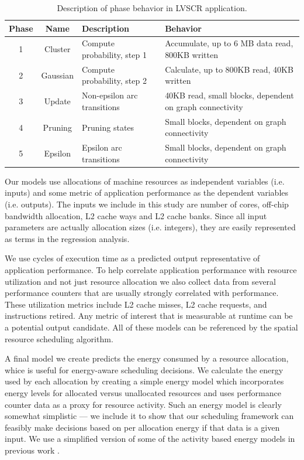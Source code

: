 \begin{table}[t]
\centering
\scriptsize
\begin{tabular}{|c|c|l|l|}
\hline
 Phase  & Name & Description & Behavior \\ \hline
 1 & Cluster  & Compute probability, step 1 &  Accumulate, up to 6 MB data read, 800KB written\\ \hline
 2 & Gaussian  & Compute probability, step 2 &  Calculate, up to 800KB read, 40KB written\\ \hline
 3 & Update & Non-epsilon arc transitions &40KB read, small blocks, dependent on graph connectivity\\ \hline
 4 & Pruning & Pruning states & Small blocks, dependent on graph connectivity\\ \hline
 5 & Epsilon & Epsilon arc transitions & Small blocks, dependent on graph connectivity\\ \hline
\end{tabular}
\caption{Description of phase behavior in LVSCR application.}
\label{table:app}
\end{table}

Our models use allocations of machine resources as independent variables (i.e. inputs) and some metric of application performance as the dependent variables (i.e. outputs).  The inputs we include in this study are number of cores, off-chip bandwidth allocation, L2 cache ways and L2 cache banks.  Since all input parameters are actually allocation sizes (i.e. integers), they are easily represented as terms in the regression analysis.

We use cycles of execution time as a predicted output representative of application performance.  To help correlate application performance with resource utilization and not just resource allocation we also collect data from several performance counters that are usually strongly correlated with performance. These utilization metrics include L2 cache misses, L2 cache requests, and instructions retired. Any metric of interest that is measurable at runtime can be a potential output candidate. All of these models can be referenced by the spatial resource scheduling algorithm.

A final model we create predicts the energy consumed by a resource allocation, whice is useful  for energy-aware scheduling decisions. We calculate the energy used by each allocation by creating a simple energy model which incorporates energy levels for allocated versus unallocated resources and uses performance counter data as a proxy for resource activity.  Such an energy model is clearly somewhat simplistic --- we include it to show that our scheduling framework can feasibly make decisions based on per allocation energy if that data is a given input.  We use a simplified version of some of the activity based energy models in previous work \cite{}.

